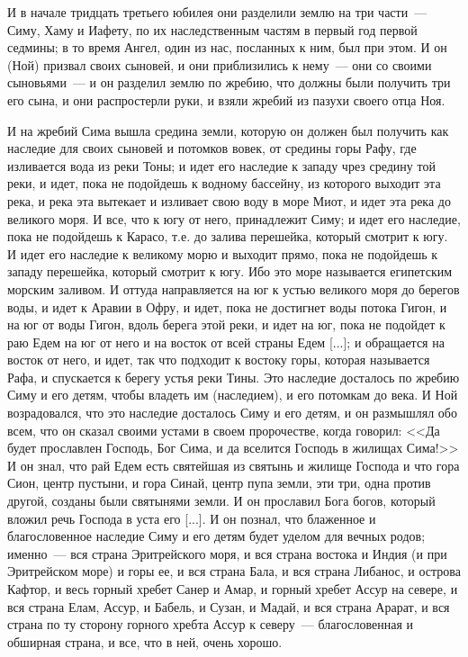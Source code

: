 И в начале тридцать третьего юбилея они
разделили землю на три части~--- Симу, Хаму и Иафету,
по их наследственным частям в первый год первой
седмины; в то время Ангел, один из нас, посланных к
ним, был при этом. И он (Ной) призвал своих сыновей,
и они приблизились к нему~--- они со своими
сыновьями~--- и он разделил землю по жребию, что
должны были получить три его сына, и они
распростерли руки, и взяли жребий из пазухи
своего отца Ноя.

И на жребий Сима вышла средина земли, которую он
должен был получить как наследие для своих
сыновей и потомков вовек, от средины горы Рафу,
где изливается вода из реки Тоны; и идет его
наследие к западу чрез средину той реки, и идет,
пока не подойдешь к водному бассейну, из которого
выходит эта река, и река эта вытекает и изливает
свою воду в море Миот, и идет эта река до великого
моря. И все, что к югу от него, принадлежит Симу; и
идет его наследие, пока не подойдешь к Карасо,
т.е. до залива перешейка, который смотрит к югу. И
идет его наследие к великому морю и выходит
прямо, пока не подойдешь к западу перешейка,
который смотрит к югу. Ибо это море называется
египетским морским заливом. И оттуда
направляется на юг к устью великого моря до
берегов воды, и идет к Аравии в Офру, и идет, пока
не достигнет воды потока Гигон, и на юг от воды
Гигон, вдоль берега этой реки, и идет на юг, пока
не подойдет к раю Едем на юг от него и на восток от
всей страны Едем [...]; и обращается на восток от
него, и идет, так что подходит к востоку горы,
которая называется Рафа, и спускается к берегу
устья реки Тины. Это наследие досталось по жребию
Симу и его детям, чтобы владеть им (наследием), и
его потомкам до века. И Ной возрадовался, что это
наследие досталось Симу и его детям, и он
размышлял обо всем, что он сказал своими устами в
своем пророчестве, когда говорил: <<Да будет
прославлен Господь, Бог Сима, и да вселится
Господь в жилищах Сима!>> И он знал, что рай Едем
есть святейшая из святынь и жилище Господа и что
гора Сион, центр пустыни, и гора Синай, центр пупа
земли, эти три, одна против другой, созданы были
святынями земли. И он прославил Бога богов,
который вложил речь Господа в уста его [...]. И он
познал, что блаженное и благословенное наследие
Симу и его детям будет уделом для вечных родов;
именно~--- вся страна Эритрейского моря, и вся
страна востока и Индия (и при Эритрейском море) и
горы ее, и вся страна Бала, и вся страна Либанос, и
острова Кафтор, и весь горный хребет Санер и Амар,
и горный хребет Ассур на севере, и вся страна
Елам, Ассур, и Бабель, и Сузан, и Мадай, и вся
страна Арарат, и вся страна по ту сторону горного
хребта Ассур к северу~--- благословенная и обширная
страна, и все, что в ней, очень хорошо.

